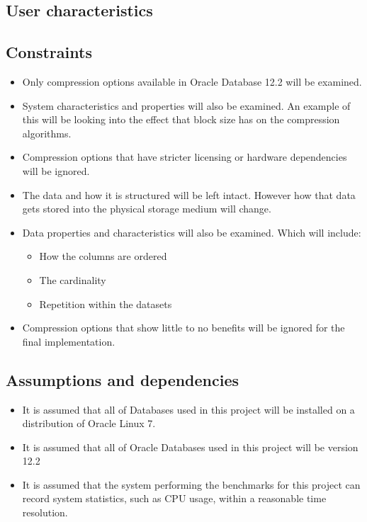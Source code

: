 \documentclass[10pt]{article}
\begin{document}
\subsection{User characteristics}
\subsection{Constraints}

\begin{itemize}
	\item Only compression options available in Oracle Database 12.2 will be examined.
	\item System characteristics and properties will also be examined. An example of this will be looking into the effect that block size has on the compression algorithms.
	\item Compression options that have stricter licensing or hardware dependencies will be ignored.
	\item The data and how it is structured will be left intact. However how that data gets stored into the physical storage medium will change.
	\item Data properties and characteristics will also be examined. Which will include:
		\begin{itemize}
			\item How the columns are ordered
			\item The cardinality
			\item Repetition within the datasets
		\end{itemize}
	\item Compression options that show little to no benefits will be ignored for the final implementation.
\end{itemize}


\subsection{Assumptions and dependencies}

\begin{itemize}
	\item It is assumed that all of Databases used in this project will be installed on a distribution of Oracle Linux 7.
	\item It is assumed that all of Oracle Databases used in this project will be version 12.2
	\item It is assumed that the system performing the benchmarks for this project can record system statistics, such as CPU usage, within a reasonable time resolution.
\end{itemize}
\end{document}
